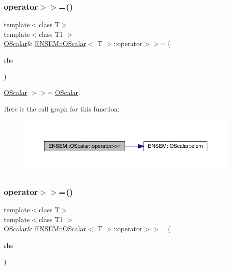 \subsubsection{\texorpdfstring{operator$>$$>$=()}{operator>>=()}\hspace{0.1cm}{\footnotesize\ttfamily [2/3]}}
{\footnotesize\ttfamily template$<$class T$>$ \\
template$<$class T1 $>$ \\
\mbox{\hyperlink{classENSEM_1_1OScalar}{O\+Scalar}}\& \mbox{\hyperlink{classENSEM_1_1OScalar}{E\+N\+S\+E\+M\+::\+O\+Scalar}}$<$ T $>$\+::operator$>$$>$= (\begin{DoxyParamCaption}\item[{const \mbox{\hyperlink{classENSEM_1_1OScalar}{O\+Scalar}}$<$ T1 $>$ \&}]{rhs }\end{DoxyParamCaption})\hspace{0.3cm}{\ttfamily [inline]}}



\mbox{\hyperlink{classENSEM_1_1OScalar}{O\+Scalar}} $>$$>$= \mbox{\hyperlink{classENSEM_1_1OScalar}{O\+Scalar}}. 

Here is the call graph for this function\+:
\nopagebreak
\begin{figure}[H]
\begin{center}
\leavevmode
\includegraphics[width=350pt]{da/d80/classENSEM_1_1OScalar_a38ab5a0779184c6ca5a1b3211e2e38ca_cgraph}
\end{center}
\end{figure}
\mbox{\label{classENSEM_1_1OScalar_a38ab5a0779184c6ca5a1b3211e2e38ca}} 
\subsubsection{\texorpdfstring{operator$>$$>$=()}{operator>>=()}\hspace{0.1cm}{\footnotesize\ttfamily [3/3]}}
{\footnotesize\ttfamily template$<$class T$>$ \\
template$<$class T1 $>$ \\
\mbox{\hyperlink{classENSEM_1_1OScalar}{O\+Scalar}}\& \mbox{\hyperlink{classENSEM_1_1OScalar}{E\+N\+S\+E\+M\+::\+O\+Scalar}}$<$ T $>$\+::operator$>$$>$= (\begin{DoxyParamCaption}\item[{const \mbox{\hyperlink{classENSEM_1_1OScalar}{O\+Scalar}}$<$ T1 $>$ \&}]{rhs }\end{DoxyParamCaption})\hspace{0.3cm}{\ttfamily [inline]}}



